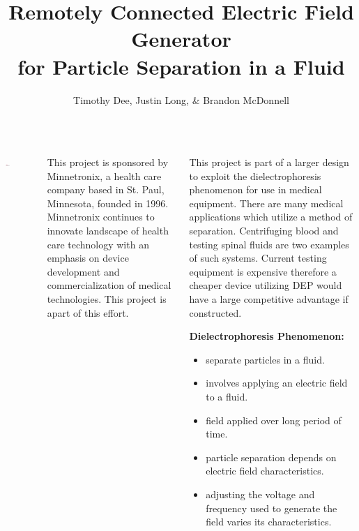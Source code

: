 \documentclass[25pt, a0paper, portrait, margin=0mm, innermargin=15mm, blockverticalspace=15mm, colspace=15mm, subcolspace=8mm]{tikzposter}
\author{Timothy Dee, Justin Long, \& Brandon McDonnell}
\title{Remotely Connected Electric Field Generator \\
for Particle Separation in a Fluid}
\institute{Team May1612}
\begin{document}
\maketitle

\begin{columns}

{
\begin{tikzfigure}
\includegraphics[width=0.15\textwidth]{images/minnetronix_logo.png}
\end{tikzfigure} 

This project is sponsored by
Minnetronix, a health care company based in St. Paul, Minnesota,
founded in 1996.
Minnetronix continues to innovate landscape of health care technology
with an emphasis on device development and commercialization of medical technologies.
This project is apart of this effort.
}

%
%
{
\begin{multicols}{2}

This project is part of a larger design to 
exploit the dielectrophoresis phenomenon for
use in medical equipment.
There are many medical applications which
utilize a method of separation.
Centrifuging blood and
testing spinal fluids are two examples of 
such systems.
Current testing equipment is expensive therefore
a cheaper device utilizing DEP would have 
a large competitive advantage if constructed. 

\textbf{Dielectrophoresis Phenomenon:}
\begin{itemize}
\item separate particles in a fluid.
\item involves applying an electric field to a fluid.
\item field applied over long period of time.
\item particle separation depends on electric field characteristics.
\item adjusting the voltage and frequency used to generate the field 
varies its characteristics.
\end{itemize}

\end{multicols}


}
\end{columns}
\end{document}
